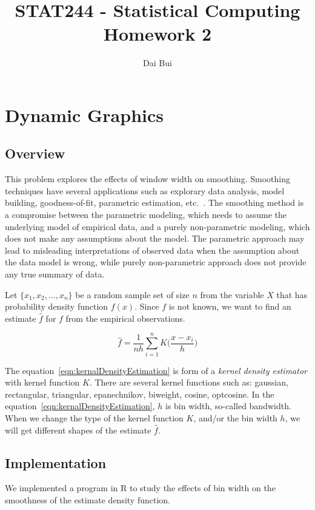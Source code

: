 \documentclass{article}
\title{STAT244 - Statistical Computing\\ Homework 2}
\author{Dai Bui}
\begin{document}
\date{}
\maketitle
\section{Dynamic Graphics}
\subsection{Overview}
This problem explores the effects of window width on
smoothing. Smoothing techniques have several applications such as explorary data
analysis, model building, goodness-of-fit, parametric estimation,
etc.~\cite{SimonoffSmoothingTechs}. The smoothing method is a compromise
between the parametric modeling, which needs to assume the underlying model of
empirical data, and a purely non-parametric modeling, which does not make any
assumptions about the model. The parametric approach may lead to misleading
interpretations of observed data when the assumption about the data model is
wrong, while purely non-parametric approach does not provide any true summary
of data.

Let $\{x_1, x_2, \ldots, x_n\}$ be a random sample set of size $n$ from the
variable $X$ that has probability density function $f(x)$. Since $f$ is not
known, we want to find an estimate $\hat{f}$ for $f$ from the empirical
observations. 

\begin{equation}\label{eqn:kernalDensityEstimation}
\hat{f}=\frac{1}{nh}\sum_{i=1}^nK\bigl(\frac{x-x_i}{h}\bigr)
\end{equation}

 The equation~\ref{eqn:kernalDensityEstimation} is form of a \textit{kernel
 density estimator} with kernel function $K$. There are several kernel functions
 such as: gaussian, rectangular, triangular, epanechnikov, biweight, cosine,
 optcosine. In the equation~\ref{eqn:kernalDensityEstimation}, $h$ is bin width, so-called bandwidth. When we change the type of the kernel function $K$, and/or the bin
 width $h$, we will get different shapes of the estimate $\hat{f}$.
 
 \subsection{Implementation}
 We implemented a program in R to study the effects of bin width on the
 smoothness of the estimate density function.
 
\end{document}
